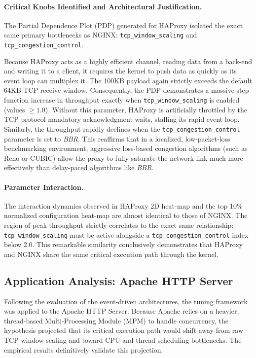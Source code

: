 \paragraph{Critical Knobs Identified and Architectural Justification.}
The Partial Dependence Plot (PDP) generated for HAProxy isolated the exact same primary bottlenecks as NGINX: \texttt{tcp\_window\_scaling} and \texttt{tcp\_congestion\_control}.

Because HAProxy acts as a highly efficient channel, reading data from a back-end and writing it to a client, it requires the kernel to push data as quickly as its event loop can multiplex it.
The 100KB payload again strictly exceeds the default 64KB TCP receive window.
Consequently, the PDP demonstrates a massive step-function increase in throughput exactly when \texttt{tcp\_window\_scaling} is enabled (values $\ge 1.0$).
Without this parameter, HAProxy is artificially throttled by the TCP protocol mandatory acknowledgment waits, stalling its rapid event loop.
Similarly, the throughput rapidly declines when the \texttt{tcp\_congestion\_control} parameter is set to \textit{BBR}.
This reaffirms that in a localized, low-packet-loss benchmarking environment, aggressive loss-based congestion algorithms (such as Reno or CUBIC) allow the proxy to fully saturate the network link much more effectively than delay-paced algorithms like \textit{BBR}.

\paragraph{Parameter Interaction.}
The interaction dynamics observed in HAProxy 2D heat-map and the top 10\% normalized configuration heat-map are almost identical to those of NGINX.
The region of peak throughput strictly correlates to the exact same relationship: \texttt{tcp\_window\_scaling} must be active alongside a \texttt{tcp\_congestion\_control} index below 2.0.
This remarkable similarity conclusively demonstrates that HAProxy and NGINX share the same critical execution path through the kernel.

\subsection{Application Analysis: Apache HTTP Server}

Following the evaluation of the event-driven architectures, the tuning framework was applied to the Apache HTTP Server.
Because Apache relies on a heavier, thread-based Multi-Processing Module (MPM) to handle concurrency, the hypothesis projected that its critical execution path would shift away from raw TCP window scaling and toward CPU and thread scheduling bottlenecks.
The empirical results definitively validate this projection.


